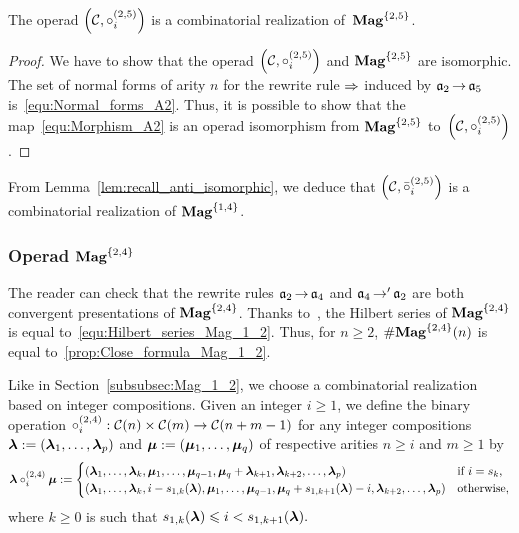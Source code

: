 \begin{Proposition} \label{prop:Realisation_Mag_1_4}
    The operad $\left(\mathcal{C}, \circ_i^{(2,5)}\right)$ is a
    combinatorial realization of~$\mathbf{Mag}^{\{2, 5\}}$.
\end{Proposition}
\begin{proof}
    We have to show that the operad
    $\left(\mathcal{C}, \circ_i^{(2,5)}\right)$ and $\mathbf{Mag}^{\{2, 5\}}$
    are isomorphic. The set of normal forms of arity $n$ for the
    rewrite rule $\operatorname{\Rightarrow}$ induced by $\mathfrak{a}_2 \operatorname{\to} \mathfrak{a}_5$
    is~\eqref{equ:Normal_forms_A2}. Thus, it is possible to show that
    the map~\eqref{equ:Morphism_A2} is an operad isomorphism from
    $\mathbf{Mag}^{\{2, 5\}}$ to~$\left(\mathcal{C}, \circ_i^{(2,5)}\right)$.
\end{proof}
\medbreak

From Lemma~\ref{lem:recall_anti_isomorphic}, we deduce that
$\left(\mathcal{C}, \bar{\circ}_i^{(2,5)}\right)$ is a combinatorial
realization of $\mathbf{Mag}^{\{1, 4\}}$.
\medbreak

\subsubsection{Operad $\mathbf{Mag}^{\{2, 4\}}$}
The reader can check that the rewrite rules $\mathfrak{a}_2 \operatorname{\to} \mathfrak{a}_4$ and
$\mathfrak{a}_4 \operatorname{\to}' \mathfrak{a}_2$ are both convergent presentations of
$\mathbf{Mag}^{\{2, 4\}}$.
Thanks to~\cite{Gir18}, the Hilbert series of $\mathbf{Mag}^{\{2, 4\}}$
is equal to~\eqref{equ:Hilbert_series_Mag_1_2}. Thus, for $n \geq 2$,
$\# \mathbf{Mag}^{\{2, 4\}}(n)$ is equal to~\eqref{prop:Close_formula_Mag_1_2}.
\medbreak

Like in Section~\ref{subsubsec:Mag_1_2}, we choose a combinatorial
realization based on integer compositions. Given an integer $i \geq 1$,
we define the binary operation
\begin{math}
    \circ_i^{(2,4)} : \mathcal{C}(n) \times \mathcal{C}(m)
    \to\mathcal{C}(n + m - 1)
\end{math}
for any integer compositions
$\bm{\lambda} := \left(\bm{\lambda}_1, \dots, \bm{\lambda}_p\right)$ and
$\bm{\mu} := \left(\bm{\mu}_1, \dots, \bm{\mu}_q\right)$ of respective arities
$n \geq i$ and $m \geq 1$ by
\begin{equation}
    \bm{\lambda} \circ_i^{(2,4)} \bm{\mu} :=
    \begin{cases}
        \left(\bm{\lambda}_1, \dots, \bm{\lambda}_k,
        \bm{\mu}_1, \dots, \bm{\mu}_{q - 1}, \bm{\mu}_q + \bm{\lambda}_{k + 1},
        \bm{\lambda}_{k + 2}, \dots, \bm{\lambda}_p\right)
            & \mbox{if } i = s_k, \\
        \left(\bm{\lambda}_1, \dots, \bm{\lambda}_k,
        i - s_{1, k}(\bm{\lambda}), \bm{\mu}_1, \dots, \bm{\mu}_{q - 1},
        \bm{\mu}_q + s_{1, k+1}(\bm{\lambda}) - i, \bm{\lambda}_{k + 2}, \dots, 
        \bm{\lambda}_p
        \right)
            & \mbox{otherwise},
    \end{cases}
\end{equation}
where $k \geq 0$ is such that
\begin{math}
    s_{1, k}(\bm{\lambda}) \leqslant i < s_{1, k+1}(\bm{\lambda}).
\end{math}
\medbreak

